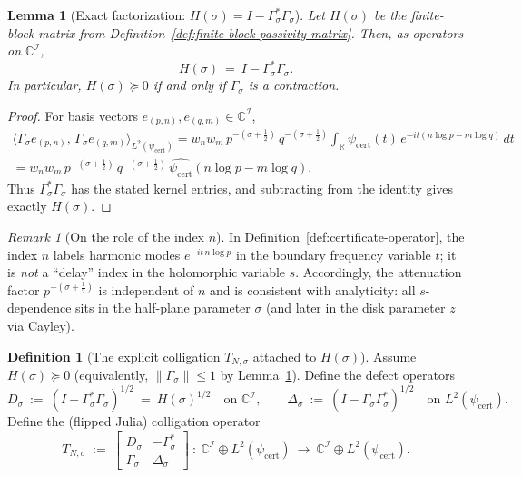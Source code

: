 \documentclass[11pt]{article}
\newtheorem{lemma}[theorem]{Lemma}
\theoremstyle{definition}
\newtheorem{definition}[theorem]{Definition}
\theoremstyle{remark}
\newtheorem{remark}[theorem]{Remark}
\theoremstyle{definition}
\newcommand{\C}{\mathbb{C}}
\newcommand{\R}{\mathbb{R}}
\begin{document}
\begin{lemma}[Exact factorization: $H(\sigma)=I-\Gamma_\sigma^*\Gamma_\sigma$]\label{lem:H-factorization}
Let $H(\sigma)$ be the finite-block matrix from Definition~\ref{def:finite-block-passivity-matrix}. Then, as operators on $\C^{\mathcal I}$,
\[
  H(\sigma)\ =\ I-\Gamma_\sigma^*\Gamma_\sigma.
\]
In particular, $H(\sigma)\succeq 0$ if and only if $\Gamma_\sigma$ is a contraction.
\end{lemma}
\begin{proof}
For basis vectors $e_{(p,n)},e_{(q,m)}\in\C^{\mathcal I}$,
\begin{multline*}
  \langle \Gamma_\sigma e_{(p,n)},\,\Gamma_\sigma e_{(q,m)}\rangle_{L^2(\psi_{\mathrm{cert}})}
  = w_n w_m\,p^{-(\sigma+\tfrac12)}\,q^{-(\sigma+\tfrac12)}
    \int_{\R}\psi_{\mathrm{cert}}(t)\,e^{-it(n\log p-m\log q)}\,dt\\
  = w_n w_m\,p^{-(\sigma+\tfrac12)}\,q^{-(\sigma+\tfrac12)}\,\widehat{\psi_{\mathrm{cert}}}(n\log p-m\log q).
\end{multline*}
Thus $\Gamma_\sigma^*\Gamma_\sigma$ has the stated kernel entries, and subtracting from the identity gives exactly $H(\sigma)$.
\end{proof}

\begin{remark}[On the role of the index $n$]\label{rem:n-role}
In Definition~\ref{def:certificate-operator}, the index $n$ labels harmonic modes $e^{-it\,n\log p}$ in the boundary frequency variable $t$; it is \emph{not} a ``delay'' index in the holomorphic variable $s$.
Accordingly, the attenuation factor $p^{-(\sigma+\tfrac12)}$ is independent of $n$ and is consistent with analyticity: all $s$-dependence sits in the half-plane parameter $\sigma$ (and later in the disk parameter $z$ via Cayley).
\end{remark}

\begin{definition}[The explicit colligation $T_{N,\sigma}$ attached to $H(\sigma)$]\label{def:TNsigma}
Assume $H(\sigma)\succeq 0$ (equivalently, $\|\Gamma_\sigma\|\le 1$ by Lemma~\ref{lem:H-factorization}). Define the defect operators
\[
  D_\sigma\ :=\ (I-\Gamma_\sigma^*\Gamma_\sigma)^{1/2}\ =\ H(\sigma)^{1/2}
  \quad\text{on }\C^{\mathcal I},
  \qquad
  \Delta_\sigma\ :=\ (I-\Gamma_\sigma\Gamma_\sigma^*)^{1/2}
  \quad\text{on }L^2(\psi_{\mathrm{cert}}).
\]
Define the (flipped Julia) colligation operator
\[
  T_{N,\sigma}\ :=\ \begin{bmatrix}
    D_\sigma & -\Gamma_\sigma^*\\
    \Gamma_\sigma & \Delta_\sigma
  \end{bmatrix}
  \ :\ \C^{\mathcal I}\oplus L^2(\psi_{\mathrm{cert}})\ \to\ \C^{\mathcal I}\oplus L^2(\psi_{\mathrm{cert}}).
\]
\end{definition}
\end{document}

